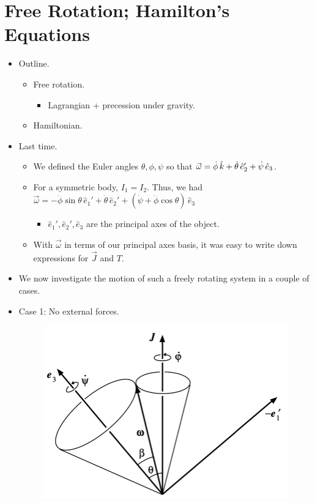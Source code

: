 \documentclass[../notes.tex]{subfiles}
\begin{document}
\section{Free Rotation; Hamilton's Equations}
\begin{itemize}
    \item {}Outline.
    \begin{itemize}
        \item Free rotation.
        \begin{itemize}
            \item Lagrangian + precession under gravity.
        \end{itemize}
        \item Hamiltonian.
    \end{itemize}
    \item Last time.
    \begin{itemize}
        \item We defined the Euler angles $\theta,\phi,\psi$ so that $\vec{\omega}=\dot{\phi}\,\hat{k}+\dot{\theta}\,\hat{e}_2'+\dot{\psi}\,\hat{e}_3$.
        \item For a symmetric body, $I_1=I_2$. Thus, we had $\vec{\omega}=-\dot{\phi}\sin\theta\,\hat{e}_1'+\dot{\theta}\,\hat{e}_2'+(\dot{\psi}+\dot{\phi}\cos\theta)\,\hat{e}_3$
        \begin{itemize}
            \item $\hat{e}_1',\hat{e}_2',\hat{e}_3$ are the principal axes of the object.
        \end{itemize}
        \item With $\vec{\omega}$ in terms of our principal axes basis, it was easy to write down expressions for $\vec{J}$ and $T$.
    \end{itemize}
    \item We now investigate the motion of such a freely rotating system in a couple of cases.
    \item Case 1: No external forces.
    \begin{figure}[h!]
        \centering
        \includegraphics[width=0.43\linewidth]{../ExtFiles/FreeRot1.png}

\end{figure}
\end{itemize}
\end{document}
